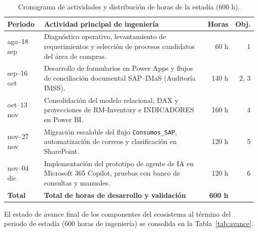 \begin{table}[H]
  \centering
  \caption{Cronograma de actividades y distribución de horas de la estadía (600 h).}
  \label{tab:cronograma}
  \begin{tabular}{@{}>{\raggedright\arraybackslash}p{2.8cm}>{\raggedright\arraybackslash}p{6.8cm}r r@{}}
    \toprule
    \textbf{Periodo} & \textbf{Actividad principal de ingeniería} & \textbf{Horas} & \textbf{Obj.} \\
    \midrule
    31 ago--18 sep & Diagnóstico operativo, levantamiento de requerimientos y selección de procesos candidatos del área de compras. & 60 h & 1 \\
    21 sep--16 oct & Desarrollo de formularios en Power Apps y flujos de conciliación documental SAP--IMaS (Auditoría IMSS). & 140 h & 2, 3 \\
    19 oct--13 nov & Consolidación del modelo relacional, DAX y proyecciones de RM-Inventory e INDICADORES en Power BI. & 160 h & 4 \\
    16 nov--27 nov & Migración escalable del flujo \texttt{Consumos\_SAP}, automatización de correos y clasificación en SharePoint. & 120 h & 5 \\
    23 nov--04 dic & Implementación del prototipo de agente de IA en Microsoft 365 Copilot, pruebas con banco de consultas y manuales. & 120 h & 6 \\
    \midrule
    \textbf{Total} & \textbf{Total de horas de desarrollo y validación} & \textbf{600 h} & \\
    \bottomrule
  \end{tabular}
\end{table}

El estado de avance final de los componentes del ecosistema al término del periodo de estadía (600 horas de ingeniería) se consolida en la Tabla~\ref{tab:avance}.

